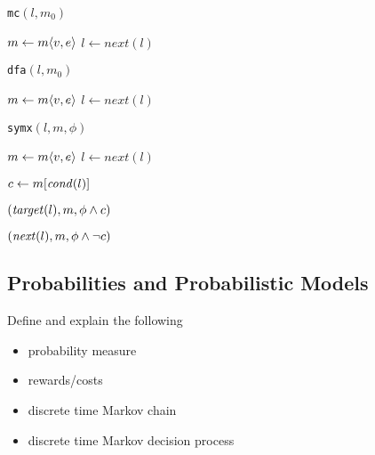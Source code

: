 \noindent\begin{minipage}[t]{0.32\textwidth}
\begin{algorithm}[H]
\renewcommand{\thealgorithm}{}
\caption{{\tt mc}$(l,m_0)$}
\label{mc}
\begin{algorithmic}
   \STATE $m \gets m\langle v, e\rangle$
   \STATE $l \gets next(l)$
 \ENDWHILE
\end{algorithmic}
\end{algorithm}
\end{minipage}%
\hfill
\begin{minipage}[t]{0.32\textwidth}
\begin{algorithm}[H]
\renewcommand{\thealgorithm}{}
\caption{{\tt dfa}$(l,m_0)$}
\label{mc}
\begin{algorithmic}
   \STATE $m \gets m\langle v, e\rangle$
   \STATE $l \gets next(l)$
 \ENDWHILE
\end{algorithmic}
\end{algorithm}
\end{minipage}%
\hfill
\begin{minipage}[t]{0.32\textwidth}
\begin{algorithm}[H]
\renewcommand{\thealgorithm}{}
\caption{{\tt symx}$(l,m,\phi)$}
\label{symexe}
\begin{algorithmic}
   \STATE $m \gets m\langle v, e\rangle$
   \STATE $l \gets next(l)$
 \ENDWHILE

 \STATE $c \gets m[\mathit{cond}(l)]$

   $(\mathit{target}(l), m, \phi \wedge c)$
 \ENDIF

   $(\mathit{next}(l), m, \phi \wedge \neg c)$
 \ENDIF
\end{algorithmic}
\end{algorithm}
\end{minipage}

\subsection{Probabilities and Probabilistic Models}
Define and explain the following
\begin{itemize}
\item probability measure
\item rewards/costs
\item discrete time Markov chain
\item discrete time Markov decision process
\end{itemize}

